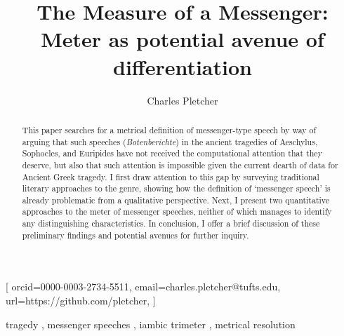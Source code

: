 \documentclass[
]{ceurart}
\begin{document}
\graphicspath{{./graphics}}




\title{The Measure of a Messenger: Meter as potential avenue of
 differentiation}

\author[1]{Charles Pletcher}[%
  orcid=0000-0003-2734-5511,
  email=charles.pletcher@tufts.edu,
  url=https://github.com/pletcher,
]
\cormark[1]
\address[1]{Tufts University, Department of Classical Studies, 10
Upper Campus Road, Medford, Massachusetts 02155, United States}


\begin{abstract} This paper searches for a metrical definition of
 messenger-type speech by way of arguing that such speeches (\textit
 {Botenberichte}) in the ancient tragedies of Aeschylus, Sophocles, and
 Euripides have not received the computational attention that they deserve,
 but also that such attention is impossible given the current dearth of data
 for Ancient Greek tragedy. I first draw attention to this gap by surveying
 traditional literary approaches to the genre, showing how the definition of
 `messenger speech' is already problematic from a qualitative perspective.
 Next, I present two quantitative approaches to the meter of messenger speeches,
 neither of which manages to identify any distinguishing characteristics. In
 conclusion, I offer a brief discussion of these preliminary findings and
 potential avenues for further inquiry.
\end{abstract}

\begin{keywords}
  tragedy \sep
  messenger speeches \sep
  iambic trimeter \sep
  metrical resolution
\end{keywords}

\maketitle
\end{document}
